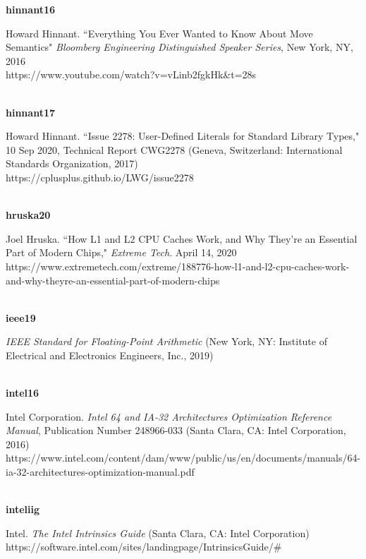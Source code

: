 \noindent\textbf{hinnant16}\\
\hspace*{2em}\parbox[t]{\textwidth}{Howard Hinnant. ``Everything You Ever Wanted to Know About Move Semantics" \textit{Bloomberg Engineering Distinguished Speaker Series}, New York, NY, 2016\\
https://www.youtube.com/watch?v=vLinb2fgkHk\&t=28s }\\

\noindent\textbf{hinnant17}\\
\hspace*{2em}\parbox[t]{\textwidth}{Howard Hinnant. ``Issue 2278: User-Defined Literals for Standard Library Types," 10 Sep 2020, Technical Report CWG2278 (Geneva, Switzerland: International Standards Organization, 2017)\\
https://cplusplus.github.io/LWG/issue2278}\\

\noindent\textbf{hruska20}\\
\hspace*{2em}\parbox[t]{\textwidth}{Joel Hruska. ``How L1 and L2 CPU Caches Work, and Why They’re an Essential Part of Modern Chips," \textit{Extreme Tech}. April 14, 2020\\
https://www.extremetech.com/extreme/188776-how-l1-and-l2-cpu-caches-work-and-why-theyre-an-essential-part-of-modern-chips}\\

\noindent\textbf{ieee19}\\
\hspace*{2em}\parbox[t]{\textwidth}{\textit{IEEE Standard for Floating-Point Arithmetic} (New York, NY: Institute of Electrical and Electronics Engineers, Inc., 2019)}\\

\noindent\textbf{intel16}\\
\hspace*{2em}\parbox[t]{\textwidth}{Intel Corporation. \textit{Intel 64 and IA-32 Architectures Optimization Reference Manual}, Publication Number 248966-033 (Santa Clara, CA: Intel Corporation, 2016)\\
https://www.intel.com/content/dam/www/public/us/en/documents/manuals/64-ia-32-architectures-optimization-manual.pdf}\\

\newpage%
\noindent\textbf{inteliig}\\
\hspace*{2em}\parbox[t]{\textwidth}{Intel. \textit{The Intel Intrinsics Guide} (Santa Clara, CA: Intel Corporation)\\
https://software.intel.com/sites/landingpage/IntrinsicsGuide/\#}\\

